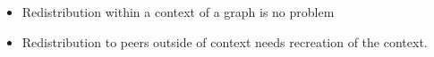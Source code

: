   \begin{itemize}

  \item Redistribution within a context of a graph is no problem
  \item Redistribution to peers outside of context needs recreation of
    the context.

  \end{itemize}



\cleardoublepage

